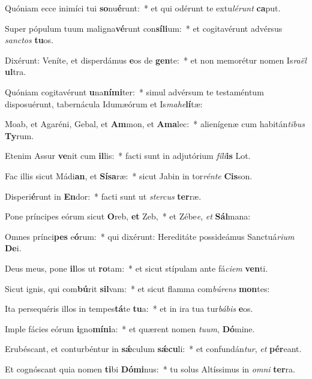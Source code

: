 \item Quóniam ecce inimíci tui \textbf{so}nu\textbf{é}runt:~* et qui odérunt te extu\textit{lé}\textit{runt} \textbf{ca}put.
\item Super pópulum tuum maligna\textbf{vé}runt con\textbf{sí}\textbf{li}um:~* et cogitavérunt advérsus \textit{sanc}\textit{tos} \textbf{tu}os.
\item Dixérunt: Veníte, et disperdámus \textbf{e}os de \textbf{gen}te:~* et non memorétur nomen Is\textit{ra}\textit{ël} \textbf{ul}tra.
\item Quóniam cogitavérunt \textbf{u}na\textbf{ní}\textbf{mi}ter:~* simul advérsum te testaméntum disposuérunt, tabernácula Idumæórum et Is\textit{ma}\textit{he}\textbf{lí}tæ:
\item Moab, et Agaréni, Gebal, et \textbf{Am}mon, et \textbf{A}\textbf{ma}lec:~* alienígenæ cum habitán\textit{ti}\textit{bus} \textbf{Ty}rum.
\item Etenim Assur \textbf{ve}nit cum \textbf{il}lis:~* facti sunt in adjutórium \textit{fí}\textit{li}\textbf{is} Lot.
\item Fac illis sicut Mádi\textbf{an}, et \textbf{Sí}\textbf{sa}ræ:~* sicut Jabin in tor\textit{rén}\textit{te} \textbf{Cis}son.
\item Disperi\textbf{é}runt in \textbf{En}dor:~* facti sunt ut \textit{ster}\textit{cus} \textbf{ter}ræ.
\item Pone príncipes eórum sicut \textbf{O}reb, \textbf{et} Zeb,~* et Zébe\textit{e}, \textit{et} \textbf{Sál}mana:
\item Omnes prínci\textbf{pes} e\textbf{ó}rum:~* qui dixérunt: Hereditáte possideámus Sanctuá\textit{ri}\textit{um} \textbf{De}i.
\item Deus meus, pone \textbf{il}los ut \textbf{ro}tam:~* et sicut stípulam ante fá\textit{ci}\textit{em} \textbf{ven}ti.
\item Sicut ignis, qui com\textbf{bú}rit \textbf{sil}vam:~* et sicut flamma com\textit{bú}\textit{rens} \textbf{mon}tes:
\item Ita persequéris illos in tempes\textbf{tá}te \textbf{tu}a:~* et in ira tua tur\textit{bá}\textit{bis} \textbf{e}os.
\item Imple fácies eórum \textbf{i}gno\textbf{mí}\textbf{ni}a:~* et quærent nomen \textit{tu}\textit{um}, \textbf{Dó}mine.
\item Erubéscant, et conturbéntur in \textbf{sǽ}culum \textbf{sǽ}\textbf{cu}li:~* et confundán\textit{tur}, \textit{et} \textbf{pér}eant.
\item Et cognóscant quia nomen \textbf{ti}bi \textbf{Dó}\textbf{mi}nus:~* tu solus Altíssimus in \textit{om}\textit{ni} \textbf{ter}ra.
